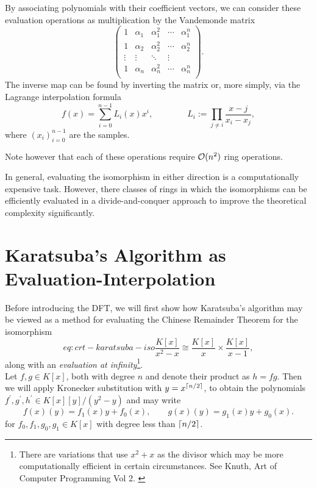 By associating polynomials with their coefficient vectors, we can consider these evaluation operations as multiplication by the Vandemonde matrix
\[
  \begin{pmatrix}
      1 & \alpha_1 & \alpha_1^2 & \cdots & \alpha_1^n\\
      1 & \alpha_2 & \alpha_2^2 & \cdots & \alpha_2^n\\
      \vdots & \vdots & \ddots & \vdots\\
      1 & \alpha_n & \alpha_n^2 & \cdots & \alpha_n^n\\
  \end{pmatrix}.
\]
The inverse map can be found by inverting the matrix or, more simply, via the Lagrange interpolation formula
\[
    f(x) = \sum_{i=0}^{n-1} L_i(x)x^i, \qquad \qquad L_i := \prod_{j \neq i} \frac{x - j}{x_i - x_j} ,
\]
where $(x_i)_{i=0}^{n-1}$ are the samples.

Note however that each of these operations require $\mathcal O(n^2)$ ring operations.

In general, evaluating the isomorphism in either direction is a computationally expensive task. However, there classes of rings in which the isomorphisms can be efficiently evaluated in a divide-and-conquer approach to improve the theoretical complexity significantly.

\section{Karatsuba's Algorithm as Evaluation-Interpolation}%
\label{sec:Karatsuba's Algorithms as Evaluation-Interpolation}

Before introducing the DFT, we will first show how Karatsuba's algorithm may be viewed as a method for evaluating the Chinese Remainder Theorem for the isomorphism
\begin{equation}{eq:crt-karatsuba-iso}
    \frac{K[x]}{x^2 - x} \cong \frac{K[x]}{x} \times \frac{K[x]}{x-1},
\end{equation}
along with an \emph{evaluation at infinity}\footnote{There are variations that use $x^2 + x$ as the divisor which may be more computationally efficient in certain circumstances. See Knuth, Art of Computer Programming Vol 2. \cite{knuthv2}}.\\

Let $f, g \in K[x]$, both with degree $n$ and denote their product as $h = fg$. Then we will apply Kronecker substitution with $y = x^{\left \lceil n/2 \right \rceil}$, to obtain the polynomials $f^\prime, g^\prime, h^\prime \in K[x][y]/(y^2 - y)$ and may write
\[
    f(x)(y) = f_1(x)y + f_0(x), \qquad g(x)(y) = g_1(x)y + g_0(x).
\]
for $f_0, f_1, g_0, g_1 \in K[x]$ with degree less than $\left \lceil n/2 \right \rceil$.

